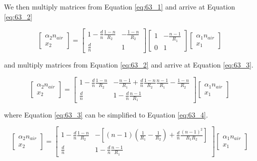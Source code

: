 \documentclass[main.tex]{subfiles}
\begin{document}
We then multiply matrices from Equation \ref{eq:63_1} and arrive at Equation \ref{eq:63_2}

\begin{equation}\label{eq:63_2}
\begin{bmatrix}
    \alpha_2 n_{air}\\
    x_2
\end{bmatrix}
=
\begin{bmatrix}
    1  - \frac{d}{n}\frac{1-n}{R_2}   &   -\frac{1-n}{R_2} \\
    \frac{d}{n}   &   1
\end{bmatrix}
\begin{bmatrix}
    1   &   -\frac{n-1}{R_1} \\
    0   &   1
\end{bmatrix}
\begin{bmatrix}
    \alpha_{1}n_{air} \\
    x_1
\end{bmatrix}
\end{equation}

and multiply matrices from Equation \ref{eq:63_2} and arrive at Equation \ref{eq:63_3}.

\begin{equation}\label{eq:63_3}
\begin{bmatrix}
    \alpha_2 n_{air}\\
    x_2
\end{bmatrix}
=
\begin{bmatrix}
    1  - \frac{d}{n}\frac{1-n}{R_2}   &  -\frac{n-1}{R_1}  + \frac{d}{n}\frac{1-n}{R_2}\frac{n-1}{R_1} -\frac{1-n}{R_2}   \\
    \frac{d}{n}                       &   1  - \frac{d}{n}\frac{n-1}{R_1}
\end{bmatrix}
\begin{bmatrix}
    \alpha_{1}n_{air} \\
    x_1
\end{bmatrix}
\end{equation}

where Equation \ref{eq:63_3} can be simplified to Equation \ref{eq:63_4}.

\begin{equation}\label{eq:63_4}
\begin{bmatrix}
    \alpha_2 n_{air}\\
    x_2
\end{bmatrix}
=
\begin{bmatrix}
    1  - \frac{d}{n}\frac{1-n}{R_2}   &  -\left[ (n-1) \left(\frac{1}{R_1}-\frac{1}{R_2}\right)  + \frac{d}{n}\frac{(n-1)^2}{R_1 R_2} \right]\\
    \frac{d}{n}                       &   1  - \frac{d}{n}\frac{n-1}{R_1}
\end{bmatrix}
\begin{bmatrix}
    \alpha_{1}n_{air} \\
    x_1
\end{bmatrix}
\end{equation}
\end{document}
